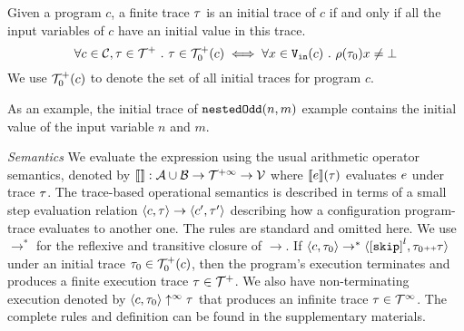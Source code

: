     \begin{defn}
        \label{def:initial_trace}
        Given a program $c$, a finite trace $\mathtt{\tau}$ is an initial trace of $c$ if and only if all the input variables of $c$ have an initial value in this trace.
        \[
        \forall c \in \mathcal{C}, \mathtt{\tau} \in \mathcal{T}^{+} ~.~ \mathtt{\tau} \in \mathcal{T}^{+}_0(c) \iff 
        \forall x \in {\ensuremath{\mathtt{V_{\mathtt{in}}}}}(c) ~.~ \rho(\mathtt{\tau}_0) x \neq \bot
        \]
        We use $\mathcal{T}^{+}_0(c)$ to denote the set of all initial traces for program $c$.
        \end{defn}
        As an example, the initial trace of $\mathtt{nestedOdd}(n, m)$ example contains the initial value of the input variable $n$ and $m$.


\emph{Semantics}
We evaluate the expression using the usual arithmetic operator semantics, denoted by
$\llbracket  \rrbracket : \mathcal{A} \cup \mathcal{B} \to \mathcal{T}^{+\infty} \to \mathcal{V}$ where
$\llbracket e \rrbracket(\mathtt{\tau})$ evaluates $e$ under trace $\mathtt{\tau}$.
The trace-based operational semantics is described in terms of a small step evaluation relation $\langle c, \mathtt{\tau} \rangle \to \langle c', \mathtt{\tau}' \rangle$ describing how a configuration program-trace evaluates to another
one.
The rules are standard and omitted here.
We use $\to^*$ for the reflexive and transitive closure of $\to$. 
If $\config{c, \trace_0} \rightarrow^{*} \config{\clabel{\eskip}^l, \trace_0 \tracecat \trace}$ under an initial trace 
$\mathtt{\tau}_0 \in \mathcal{T}^{+}_0(c)$,
then the program's execution terminates and produces a finite execution trace $\mathtt{\tau} \in \mathcal{T}^{+}$. We also have non-terminating execution denoted by $\langle c, \mathtt{\tau}_0 \rangle \uparrow^{\infty} \mathtt{\tau}$ that produces an infinite trace $\mathtt{\tau} \in \mathcal{T}^{\infty}$. The complete rules and definition can be found in the supplementary materials.
